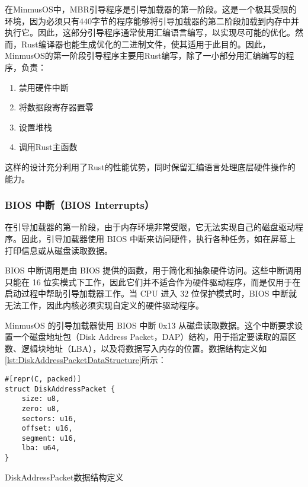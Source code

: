 在MinmusOS中，MBR引导程序是引导加载器的第一阶段。这是一个极其受限的环境，因为必须只有440字节的程序能够将引导加载器的第二阶段加载到内存中并执行它。因此，这部分引导程序通常使用汇编语言编写，以实现尽可能的优化。然而，Rust编译器也能生成优化的二进制文件，使其适用于此目的。因此，MinmusOS的第一阶段引导程序主要用Rust编写，除了一小部分用汇编编写的程序，负责：

\begin{enumerate}
    \item 禁用硬件中断
    \item 将数据段寄存器置零
    \item 设置堆栈
    \item 调用Rust主函数
\end{enumerate}

这样的设计充分利用了Rust的性能优势，同时保留汇编语言处理底层硬件操作的能力。

\subsubsection{BIOS 中断（BIOS Interrupts）}

在引导加载器的第一阶段，由于内存环境非常受限，它无法实现自己的磁盘驱动程序。因此，引导加载器使用 BIOS 中断来访问硬件，执行各种任务，如在屏幕上打印信息或从磁盘读取数据。

BIOS 中断调用是由 BIOS 提供的函数，用于简化和抽象硬件访问。这些中断调用只能在 16 位实模式下工作，因此它们并不适合作为硬件驱动程序，而是仅用于在启动过程中帮助引导加载器工作。当 CPU 进入 32 位保护模式时，BIOS 中断就无法工作，因此内核必须实现自定义的硬件驱动程序。

MinmusOS 的引导加载器使用 BIOS 中断 0x13 从磁盘读取数据。这个中断要求设置一个磁盘地址包（Disk Address Packet，DAP）结构，用于指定要读取的扇区数、逻辑块地址（LBA），以及将数据写入内存的位置。数据结构定义如\cref{lst:DiskAddressPacketDataStructure}所示：

\begin{listing}[htbp]
    \begin{verbatim}
#[repr(C, packed)]
struct DiskAddressPacket {
    size: u8,
    zero: u8,
    sectors: u16,
    offset: u16,
    segment: u16,
    lba: u64,
}
    \end{verbatim}
    \caption{DiskAddressPacket数据结构定义}\label{lst:DiskAddressPacketDataStructure}
\end{listing}


